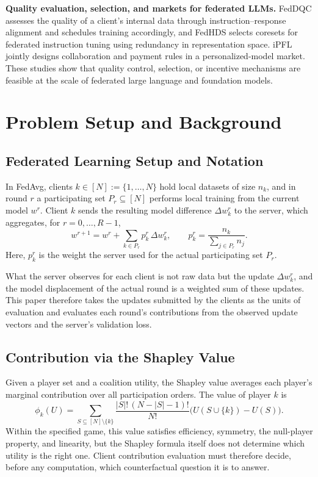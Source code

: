 \documentclass[letterpaper]{article} %
\theoremstyle{definition} %
\begin{document}
\textbf{Quality evaluation, selection, and markets for federated LLMs.}
FedDQC \citep{du2025feddqc} assesses the quality of a client's internal data
through instruction--response alignment and schedules training accordingly,
and FedHDS \citep{qin2025federated} selects coresets for federated
instruction tuning using redundancy in representation space. iPFL
\citep{zhang2025incentivizing} jointly
designs collaboration and payment rules in a personalized-model market. These
studies show that quality control, selection, or incentive mechanisms are
feasible at the scale of federated large language and foundation models.

\section{Problem Setup and Background}
\label{sec:background}

\subsection{Federated Learning Setup and Notation}
\label{sec:fedavg}

In FedAvg, clients $k \in [N] := \{1,\dots,N\}$
hold local datasets of size $n_k$, and in round $r$ a participating set
$P_r \subseteq [N]$ performs local training from the current model $w^r$.
Client $k$ sends the resulting model difference $\Delta w_k^r$ to the server,
which aggregates, for $r=0,\dots,R{-}1$,
\begin{equation}
\label{eq:fedavg}
w^{r+1}
= w^r + \sum_{k \in P_r} p_k^r\,\Delta w_k^r,
\qquad
p_k^r = \frac{n_k}{\sum_{j \in P_r} n_j}.
\end{equation}
Here, $p_k^r$ is the weight the server used for the actual participating set
$P_r$.

What the server observes for each client is not raw data but the update
$\Delta w_k^r$, and the model displacement of the actual round is a weighted
sum of these updates. This paper therefore takes the updates submitted by the
clients as the units of evaluation and evaluates each round's contributions
from the observed update vectors and the server's validation loss.

\subsection{Contribution via the Shapley Value}
\label{sec:datashapley}

Given a player set and a coalition utility, the Shapley value averages each
player's marginal contribution over all participation orders. The value of
player $k$ is
\begin{equation}
\label{eq:shapley}
\phi_k(U)
= \sum_{S \subseteq [N]\setminus\{k\}}
\frac{|S|!\,(N{-}|S|{-}1)!}{N!}
\bigl(U(S\cup\{k\})-U(S)\bigr).
\end{equation}
Within the specified game, this value satisfies efficiency, symmetry, the
null-player property, and linearity, but the Shapley
formula itself does not determine which utility is the right one. Client
contribution evaluation must therefore decide, before any computation, which
counterfactual question it is to answer.
\end{document}
